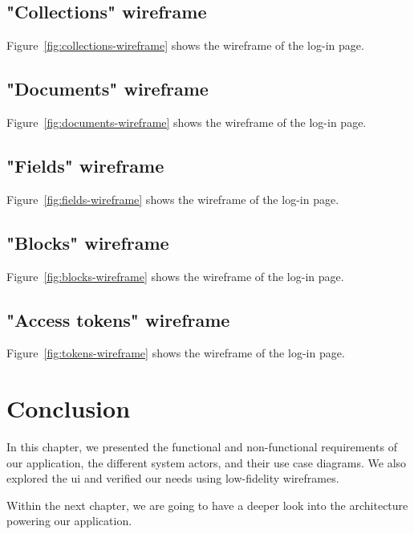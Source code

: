 
\subsection{"Collections" wireframe}
Figure~\ref{fig:collections-wireframe} shows the wireframe of the log-in page.


\subsection{"Documents" wireframe}
Figure~\ref{fig:documents-wireframe} shows the wireframe of the log-in page.


\subsection{"Fields" wireframe}
Figure~\ref{fig:fields-wireframe} shows the wireframe of the log-in page.


\subsection{"Blocks" wireframe}
Figure~\ref{fig:blocks-wireframe} shows the wireframe of the log-in page.


\subsection{"Access tokens" wireframe}
Figure~\ref{fig:tokens-wireframe} shows the wireframe of the log-in page.


\section{Conclusion}

In this chapter, we presented the functional and non-functional requirements of our application, the different system actors, and their use case diagrams.
We also explored the \acrlong{ui} and verified our needs using low-fidelity wireframes.

Within the next chapter, we are going to have a deeper look into the architecture powering our application.